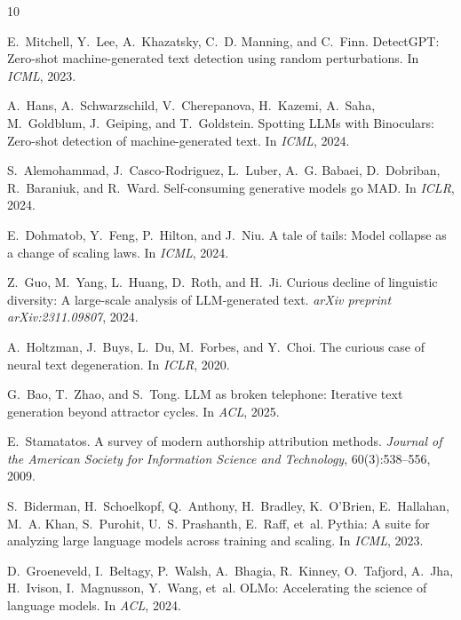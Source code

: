 \documentclass[11pt,a4paper]{article}
\begin{document}

\begin{thebibliography}{10}

E.~Mitchell, Y.~Lee, A.~Khazatsky, C.~D. Manning, and C.~Finn.
\newblock DetectGPT: Zero-shot machine-generated text detection using random perturbations.
\newblock In \emph{ICML}, 2023.

A.~Hans, A.~Schwarzschild, V.~Cherepanova, H.~Kazemi, A.~Saha, M.~Goldblum, J.~Geiping, and T.~Goldstein.
\newblock Spotting LLMs with Binoculars: Zero-shot detection of machine-generated text.
\newblock In \emph{ICML}, 2024.

S.~Alemohammad, J.~Casco-Rodriguez, L.~Luber, A.~G. Babaei, D.~Dobriban, R.~Baraniuk, and R.~Ward.
\newblock Self-consuming generative models go MAD.
\newblock In \emph{ICLR}, 2024.

E.~Dohmatob, Y.~Feng, P.~Hilton, and J.~Niu.
\newblock A tale of tails: Model collapse as a change of scaling laws.
\newblock In \emph{ICML}, 2024.

Z.~Guo, M.~Yang, L.~Huang, D.~Roth, and H.~Ji.
\newblock Curious decline of linguistic diversity: A large-scale analysis of LLM-generated text.
\newblock \emph{arXiv preprint arXiv:2311.09807}, 2024.

A.~Holtzman, J.~Buys, L.~Du, M.~Forbes, and Y.~Choi.
\newblock The curious case of neural text degeneration.
\newblock In \emph{ICLR}, 2020.

G.~Bao, T.~Zhao, and S.~Tong.
\newblock LLM as broken telephone: Iterative text generation beyond attractor cycles.
\newblock In \emph{ACL}, 2025.

E.~Stamatatos.
\newblock A survey of modern authorship attribution methods.
\newblock \emph{Journal of the American Society for Information Science and Technology}, 60(3):538--556, 2009.

S.~Biderman, H.~Schoelkopf, Q.~Anthony, H.~Bradley, K.~O'Brien, E.~Hallahan, M.~A. Khan, S.~Purohit, U.~S. Prashanth, E.~Raff, et~al.
\newblock Pythia: A suite for analyzing large language models across training and scaling.
\newblock In \emph{ICML}, 2023.

D.~Groeneveld, I.~Beltagy, P.~Walsh, A.~Bhagia, R.~Kinney, O.~Tafjord, A.~Jha, H.~Ivison, I.~Magnusson, Y.~Wang, et~al.
\newblock OLMo: Accelerating the science of language models.
\newblock In \emph{ACL}, 2024.

\end{thebibliography}
\end{document}
